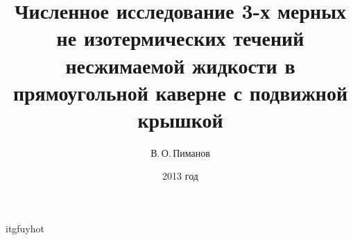 \documentclass[10pt,pdf,hyperref={unicode}]{beamer}
\begin{document}
\title{Численное исследование 3-х мерных не изотермических течений несжимаемой жидкости в прямоугольной каверне с подвижной крышкой}
\author{В.{\,}О.{\,}Пиманов}
\date{2013 год}



\begin{frame}
	itgfuyhot
\end{frame}
\end{document}
